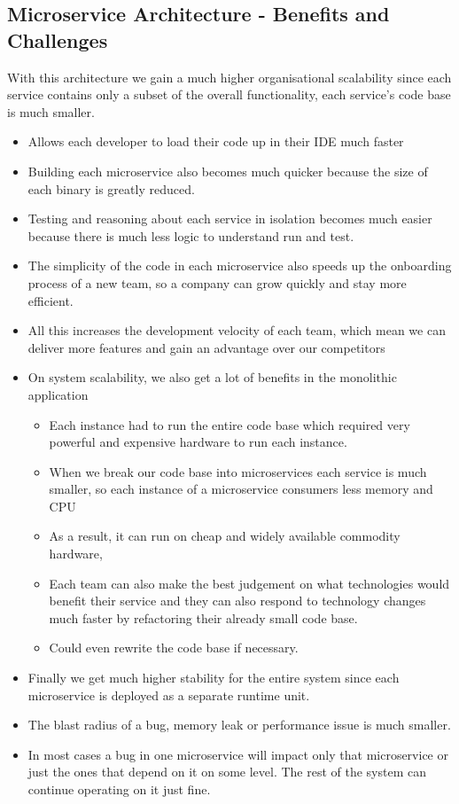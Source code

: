\documentclass[a4paper, 11pt]{book}
\begin{document}
    \subsection{Microservice Architecture - Benefits and Challenges}
    With this architecture we gain a much higher organisational scalability since each service contains only a subset of the overall functionality, each service's code base is much smaller.
    \begin{itemize}
        \item Allows each developer to load their code up in their IDE much faster
        \item Building each microservice also becomes much quicker because the size of each binary is greatly reduced.
        \item Testing and reasoning about each service in isolation becomes much easier because there is much less logic to understand run and test.
        \item The simplicity of the code in each microservice also speeds up the onboarding process of a new team, so a company can grow quickly and stay more efficient.
        \item All this increases the development velocity of each team, which mean we can deliver more features and gain an advantage over our competitors
        \item On system scalability, we also get a lot of benefits in the monolithic application
        \begin{itemize}
            \item Each instance had to run the entire code base which required very powerful and expensive hardware to run each instance.
            \item When we break our code base into microservices each service is much smaller, so each instance of a microservice consumers less memory and CPU
            \item As a result, it can run on cheap and widely available commodity hardware,
            \item Each team can also make the best judgement on what technologies would benefit their service and they can also respond to technology changes much faster by refactoring their already small code base.
            \item Could even rewrite the code base if necessary.
        \end{itemize}
        \item Finally we get much higher stability for the entire system since each microservice is deployed as a separate runtime unit.
        \item The blast radius of a bug, memory leak or performance issue is much smaller.
        \item In most cases a bug in one microservice will impact only that microservice or just the ones that depend on it on some level. The rest of the system can continue operating on it just fine.
    \end{itemize}
\end{document}
